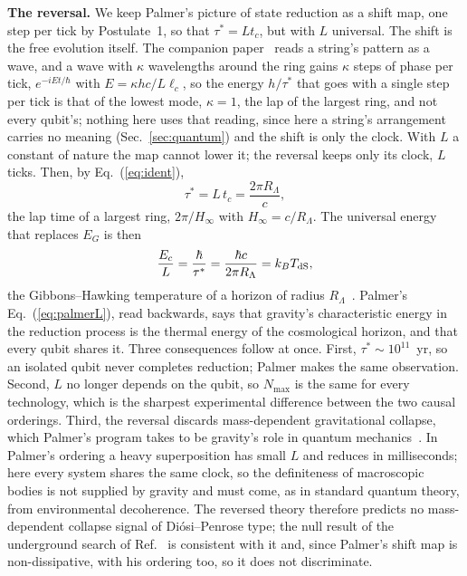 \documentclass[aps,prd,twocolumn,superscriptaddress,nofootinbib,showkeys]{revtex4-2}
\newcommand{\lc}{\ell_c}
\newcommand{\tc}{t_c}
\newcommand{\Ec}{E_c}
\newcommand{\RL}{R_\Lambda}
\begin{document}
\textbf{The reversal.} We keep Palmer's picture of state reduction as a shift map, one step per tick by Postulate~1, so that $\tau^* = L\tc$, but with $L$ universal. The shift is the free evolution itself. The companion paper~\cite{korytko2026c} reads a string's pattern as a wave, and a wave with $\kappa$ wavelengths around the ring gains $\kappa$ steps of phase per tick, $e^{-iEt/\hbar}$ with $E = \kappa hc/L\lc$, so the energy $h/\tau^*$ that goes with a single step per tick is that of the lowest mode, $\kappa = 1$, the lap of the largest ring, and not every qubit's; nothing here uses that reading, since here a string's arrangement carries no meaning (Sec.~\ref{sec:quantum}) and the shift is only the clock. With $L$ a constant of nature the map cannot lower it; the reversal keeps only its clock, $L$ ticks. Then, by Eq.~(\ref{eq:ident}),
\begin{equation}
\tau^* = L\,\tc = \frac{2\pi\RL}{c} ,
\label{eq:clock}
\end{equation}
the lap time of a largest ring, $2\pi/H_\infty$ with $H_\infty = c/\RL$. The universal energy that replaces $E_G$ is then
\begin{equation}
\frac{\Ec}{L} = \frac{\hbar}{\tau^*} = \frac{\hbar c}{2\pi\RL} = k_B T_{\rm dS},
\label{eq:energy}
\end{equation}
the Gibbons--Hawking temperature of a horizon of radius $\RL$~\cite{gibbons1977}. Palmer's Eq.~(\ref{eq:palmerL}), read backwards, says that gravity's characteristic energy in the reduction process is the thermal energy of the cosmological horizon, and that every qubit shares it. Three consequences follow at once. First, $\tau^*\sim10^{11}$~yr, so an isolated qubit never completes reduction; Palmer makes the same observation. Second, $L$ no longer depends on the qubit, so $N_{\max}$ is the same for every technology, which is the sharpest experimental difference between the two causal orderings. Third, the reversal discards mass-dependent gravitational collapse, which Palmer's program takes to be gravity's role in quantum mechanics~\cite{palmer2016}. In Palmer's ordering a heavy superposition has small $L$ and reduces in milliseconds; here every system shares the same clock, so the definiteness of macroscopic bodies is not supplied by gravity and must come, as in standard quantum theory, from environmental decoherence. The reversed theory therefore predicts no mass-dependent collapse signal of Di\'osi--Penrose type; the null result of the underground search of Ref.~\cite{donadi2021} is consistent with it and, since Palmer's shift map is non-dissipative, with his ordering too, so it does not discriminate.
\end{document}

